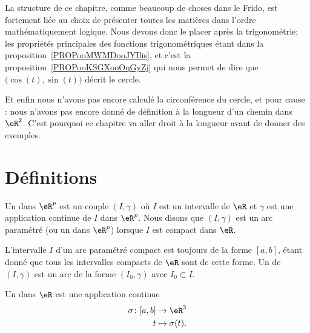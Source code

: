 
La structure de ce chapitre, comme beaucoup de choses dans le Frido, est fortement liée au choix de présenter toutes les matières dans l'ordre mathématiquement logique. Nous devons donc le placer après la trigonométrie; les propriétés principales des fonctions trigonométriques étant dans la proposition~\ref{PROPooMWMDooJYIlis}, et c'est la proposition~\ref{PROPooKSGXooOqGyZj} qui nous permet de dire que \( \big( \cos(t),\sin(t) \big)\) décrit le cercle.

Et enfin nous n'avons pas encore calculé la circonférence du cercle, et pour cause : nous n'avons pas encore donné de définition à la longueur d'un chemin dans \( \eR^2\). C'est pourquoi ce chapitre va aller droit à la longueur avant de donner des exemples.

\section{Définitions}        \label{SecDeExCPar}

\begin{definition}
	Un  dans \( \eR^p\) est un couple \( (I,\gamma)\) où \( I\) est un intervalle de \( \eR\) et \( \gamma\) est une application continue de \( I\) dans \( \eR^p\). Nous disons que \( (I,\gamma)\) est un arc paramétré  (ou un  dans \( \eR^p\)) lorsque \( I\) est compact dans \( \eR\).
\end{definition}
L'intervalle \( I\) d'un arc paramétré compact est toujours de la forme \( [a,b]\), étant donné que tous les intervalles compacts de \( \eR\) sont de cette forme. Un  de \( (I,\gamma)\) est un arc de la forme \( (I_0,\gamma)\) avec \( I_0\subset I\).

\begin{definition}
	Un  dans \( \eR\) est une application continue
	\begin{equation}
		\begin{aligned}
			\sigma\colon [a,b] & \to \eR^3          \\
			t                  & \mapsto \sigma(t).
		\end{aligned}
	\end{equation}
\end{definition}

